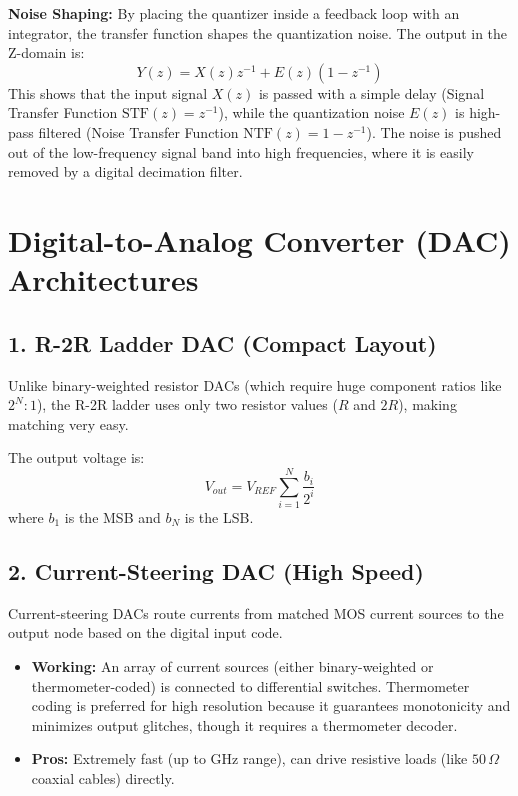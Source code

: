\documentclass[12pt,a4paper]{article}
\begin{document}
\textbf{Noise Shaping:} By placing the quantizer inside a feedback loop with an integrator, the transfer function shapes the quantization noise. The output in the Z-domain is:
\[
Y(z) = X(z) z^{-1} + E(z)(1 - z^{-1})
\]
This shows that the input signal $X(z)$ is passed with a simple delay (Signal Transfer Function $\text{STF}(z) = z^{-1}$), while the quantization noise $E(z)$ is high-pass filtered (Noise Transfer Function $\text{NTF}(z) = 1-z^{-1}$). The noise is pushed out of the low-frequency signal band into high frequencies, where it is easily removed by a digital decimation filter.

\section{Digital-to-Analog Converter (DAC) Architectures}

\subsection{1. R-2R Ladder DAC (Compact Layout)}
Unlike binary-weighted resistor DACs (which require huge component ratios like $2^N:1$), the R-2R ladder uses only two resistor values ($R$ and $2R$), making matching very easy.

The output voltage is:
\[
V_{out} = V_{REF} \sum_{i=1}^{N} \frac{b_i}{2^i}
\]
where $b_1$ is the MSB and $b_N$ is the LSB.

\subsection{2. Current-Steering DAC (High Speed)}
Current-steering DACs route currents from matched MOS current sources to the output node based on the digital input code.
\begin{itemize}[leftmargin=*, itemsep=2pt]
  \item \textbf{Working:} An array of current sources (either binary-weighted or thermometer-coded) is connected to differential switches. Thermometer coding is preferred for high resolution because it guarantees monotonicity and minimizes output glitches, though it requires a thermometer decoder.
  \item \textbf{Pros:} Extremely fast (up to GHz range), can drive resistive loads (like $50\,\Omega$ coaxial cables) directly.
\end{itemize}
\end{document}
